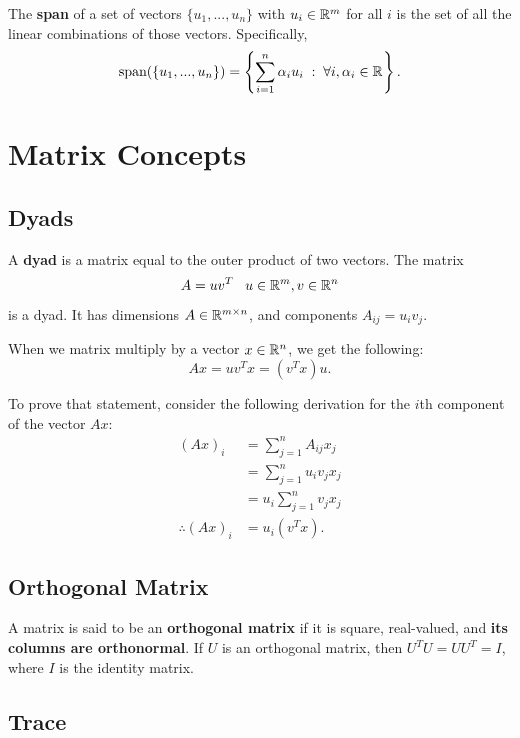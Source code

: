 \documentclass[12pt]{article}
\begin{document}
The \textbf{span} of a set of vectors $\{u_1, ..., u_n\}$ with $u_i \in { {\mathbb R}^{m} }$ for all $i$ is the set of all the linear combinations of those vectors. Specifically,
%
\begin{equation*}
\text{span}(\{u_1, ..., u_n\}) = \left\{ \sum_{i=1}^n \alpha_i u_i \; : \; \forall i, \alpha_i \in { {\mathbb R}^{} }\right\}.
\end{equation*}

\pagebreak

\section{Matrix Concepts}
\subsection{Dyads}

A \textbf{dyad} is a matrix equal to the outer product of two vectors. The matrix
%
\begin{equation*}
A = uv^T \;\;\; u \in{ {\mathbb R}^{m} }, v \in { {\mathbb R}^{n} }
\end{equation*}
%
is a dyad. It has dimensions $A \in { {\mathbb R}^{m \times n} }$, and components $A_{ij} = u_i v_j$. 

When we matrix multiply by a vector $x \in { {\mathbb R}^{n} }$, we get the following:
%
\begin{equation*}
Ax = uv^T x = (v^T x) u.
\end{equation*}

To prove that statement, consider the following derivation for the $i$th component of the vector $Ax$:
%
\begin{align*}
(Ax)_i &= \sum_{j=1}^n A_{ij} x_j \\
&= \sum_{j=1}^n u_i v_j x_j \\
&= u_i \sum_{j=1}^n v_j x_j \\
\therefore (Ax)_i &= u_i (v^T x).
\end{align*}

\subsection{Orthogonal Matrix}

A matrix is said to be an \textbf{orthogonal matrix} if it is square, real-valued, and \textbf{its columns are orthonormal}. If $U$ is an orthogonal matrix, then $U^T U = U U^T = I$, where $I$ is the identity matrix.  

\subsection{Trace}
\end{document}
